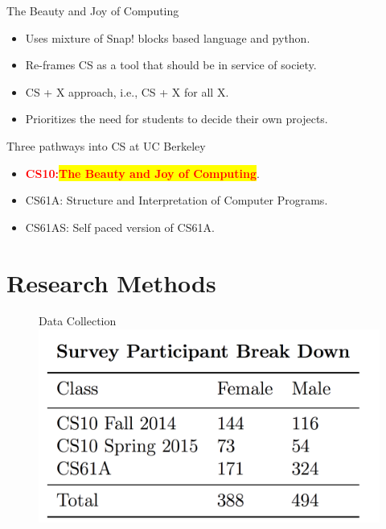\documentclass{beamer}                  %
\newcommand{\hilight}[1]{\colorbox{yellow}{#1}}
\begin{document}
        \begin{frame}{}
            The Beauty and Joy of Computing
            \begin{itemize}
                 \item Uses mixture of Snap! blocks based language and python.
                 \item Re-frames CS as a tool that should be in service of society.
                 \item CS + X approach, i.e., CS + X for all X.
                 \item Prioritizes the need for students to decide their own projects.
            \end{itemize}
        \end{frame}

        \begin{frame}{}
        Three pathways into CS at UC Berkeley
            \begin{itemize}
                \item \textcolor{red}{\textbf{CS10:\hilight{The Beauty and Joy of Computing}}}.
                \item CS61A: Structure and Interpretation of Computer Programs.
                \item CS61AS: Self paced version of CS61A.

            \end{itemize}
        \end{frame}






\section{Research Methods}

\begin{frame}{}

  \begin{figure}[!htbp]
  Data Collection
      \centering   
      \includegraphics[width=1\textwidth]{dataCollection}   
  \end{figure}
\end{frame}
\end{document}
